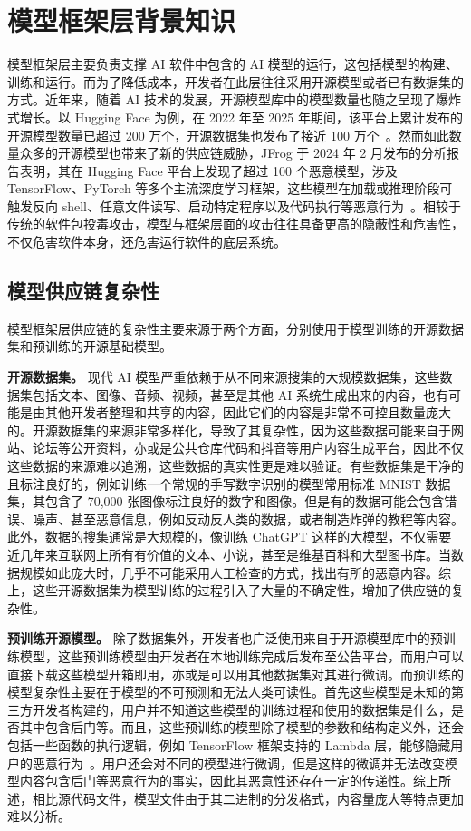 \section{模型框架层背景知识}
模型框架层主要负责支撑 AI 软件中包含的 AI 模型的运行，这包括模型的构建、训练和运行。而为了降低成本，开发者在此层往往采用开源模型或者已有数据集的方式。近年来，随着 AI 技术的发展，开源模型库中的模型数量也随之呈现了爆炸式增长。以 Hugging Face 为例，在 2022 年至 2025 年期间，该平台上累计发布的开源模型数量已超过 200 万个，开源数据集也发布了接近 100 万个~\cite{huggingface-2m-models}。然而如此数量众多的开源模型也带来了新的供应链威胁，JFrog 于 2024 年 2 月发布的分析报告表明，其在 Hugging Face 平台上发现了超过 100 个恶意模型，涉及 TensorFlow、PyTorch 等多个主流深度学习框架，这些模型在加载或推理阶段可触发反向 shell、任意文件读写、启动特定程序以及代码执行等恶意行为~\cite{jfrog-malicious-huggingface-models}。相较于传统的软件包投毒攻击，模型与框架层面的攻击往往具备更高的隐蔽性和危害性，不仅危害软件本身，还危害运行软件的底层系统。

\subsection{模型供应链复杂性}
模型框架层供应链的复杂性主要来源于两个方面，分别使用于模型训练的开源数据集和预训练的开源基础模型。

\textbf{开源数据集。}
现代 AI 模型严重依赖于从不同来源搜集的大规模数据集，这些数据集包括文本、图像、音频、视频，甚至是其他 AI 系统生成出来的内容，也有可能是由其他开发者整理和共享的内容，因此它们的内容是非常不可控且数量庞大的。开源数据集的来源非常多样化，导致了其复杂性，因为这些数据可能来自于网站、论坛等公开资料，亦或是公共仓库代码和抖音等用户内容生成平台，因此不仅这些数据的来源难以追溯，这些数据的真实性更是难以验证。有些数据集是干净的且标注良好的，例如训练一个常规的手写数字识别的模型常用标准 MNIST 数据集，其包含了 70,000 张图像标注良好的数字和图像。但是有的数据可能会包含错误、噪声、甚至恶意信息，例如反动反人类的数据，或者制造炸弹的教程等内容。此外，数据的搜集通常是大规模的，像训练 ChatGPT 这样的大模型，不仅需要近几年来互联网上所有有价值的文本、小说，甚至是维基百科和大型图书库。当数据规模如此庞大时，几乎不可能采用人工检查的方式，找出有所的恶意内容。综上，这些开源数据集为模型训练的过程引入了大量的不确定性，增加了供应链的复杂性。

\textbf{预训练开源模型。}
除了数据集外，开发者也广泛使用来自于开源模型库中的预训练模型，这些预训练模型由开发者在本地训练完成后发布至公告平台，而用户可以直接下载这些模型开箱即用，亦或是可以用其他数据集对其进行微调。而预训练的模型复杂性主要在于模型的不可预测和无法人类可读性。首先这些模型是未知的第三方开发者构建的，用户并不知道这些模型的训练过程和使用的数据集是什么，是否其中包含后门等。而且，这些预训练的模型除了模型的参数和结构定义外，还会包括一些函数的执行逻辑，例如 TensorFlow 框架支持的 Lambda 层，能够隐藏用户的恶意行为~\cite{tensorflow-rce-poc,cert-vul-253266}。用户还会对不同的模型进行微调，但是这样的微调并无法改变模型内容包含后门等恶意行为的事实，因此其恶意性还存在一定的传递性。综上所述，相比源代码文件，模型文件由于其二进制的分发格式，内容量庞大等特点更加难以分析。

